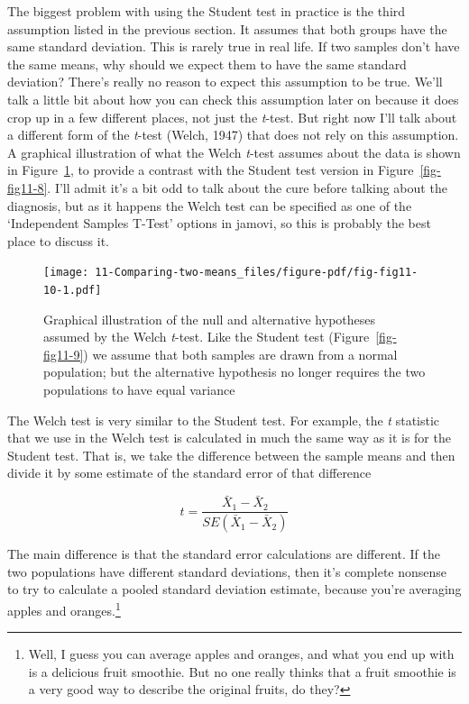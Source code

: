 \documentclass[
  a4paper,
]{book}
\begin{document}
The biggest problem with using the Student test in practice is the third
assumption listed in the previous section. It assumes that both groups
have the same standard deviation. This is rarely true in real life. If
two samples don't have the same means, why should we expect them to have
the same standard deviation? There's really no reason to expect this
assumption to be true. We'll talk a little bit about how you can check
this assumption later on because it does crop up in a few different
places, not just the \emph{t}-test. But right now I'll talk about a
different form of the \emph{t}-test (Welch, 1947) that does not rely on
this assumption. A graphical illustration of what the Welch
\emph{t}-test assumes about the data is shown in
Figure~\ref{fig-fig11-10}, to provide a contrast with the Student test
version in Figure~\ref{fig-fig11-8}. I'll admit it's a bit odd to talk
about the cure before talking about the diagnosis, but as it happens the
Welch test can be specified as one of the `Independent Samples T-Test'
options in jamovi, so this is probably the best place to discuss it.

\begin{figure}

\texttt{[image: 11-Comparing-two-means\_files/figure-pdf/fig-fig11-10-1.pdf]} \hfill{}

\caption{\label{fig-fig11-10}Graphical illustration of the null and
alternative hypotheses assumed by the Welch \emph{t}-test. Like the
Student test (Figure~\ref{fig-fig11-9}) we assume that both samples are
drawn from a normal population; but the alternative hypothesis no longer
requires the two populations to have equal variance}

\end{figure}

The Welch test is very similar to the Student test. For example, the
\emph{t} statistic that we use in the Welch test is calculated in much
the same way as it is for the Student test. That is, we take the
difference between the sample means and then divide it by some estimate
of the standard error of that difference

\[t=\frac{\bar{X}_1-\bar{X}_2}{SE(\bar{X}_1-\bar{X}_2)}\]

The main difference is that the standard error calculations are
different. If the two populations have different standard deviations,
then it's complete nonsense to try to calculate a pooled standard
deviation estimate, because you're averaging apples and
oranges.\footnote{Well, I guess you can average apples and oranges, and
  what you end up with is a delicious fruit smoothie. But no one really
  thinks that a fruit smoothie is a very good way to describe the
  original fruits, do they?}
\end{document}

